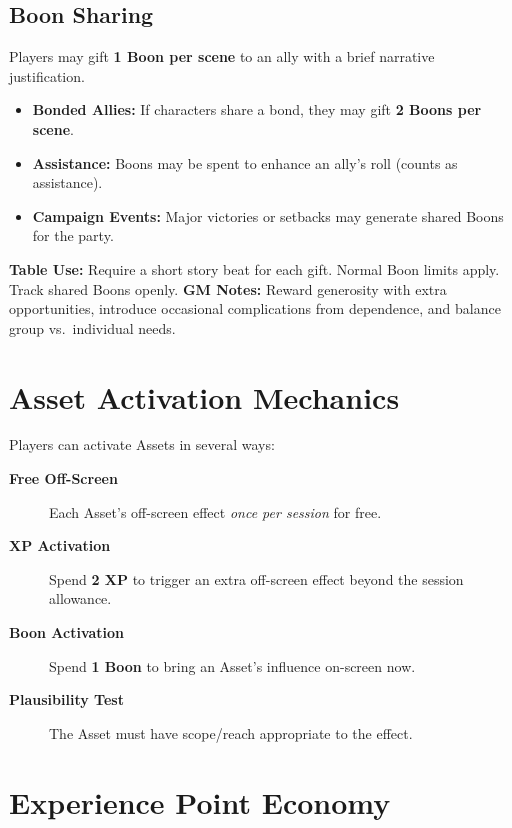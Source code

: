 \subsection{Boon Sharing}

Players may gift \textbf{1 Boon per scene} to an ally with a brief narrative justification.  
\begin{itemize}
  \item \textbf{Bonded Allies:} If characters share a bond, they may gift \textbf{2 Boons per scene}.  
  \item \textbf{Assistance:} Boons may be spent to enhance an ally’s roll (counts as assistance).  
  \item \textbf{Campaign Events:} Major victories or setbacks may generate shared Boons for the party.  
\end{itemize}

\textbf{Table Use:} Require a short story beat for each gift. Normal Boon limits apply. Track shared Boons openly.  
\textbf{GM Notes:} Reward generosity with extra opportunities, introduce occasional complications from dependence, and balance group vs.\ individual needs.

\section{Asset Activation Mechanics}
\label{sec:asset-activations}
Players can activate Assets in several ways:
\begin{description}
\item[\textbf{Free Off-Screen}] Each Asset's off-screen effect \emph{once per session} for free. 
\item[\textbf{XP Activation}] Spend \textbf{2 XP} to trigger an extra off-screen effect beyond the session allowance. 
\item[\textbf{Boon Activation}] Spend \textbf{1 Boon} to bring an Asset's influence on-screen now. 
\item[\textbf{Plausibility Test}] The Asset must have scope/reach appropriate to the effect. 
\end{description}

\section{Experience Point Economy}
\label{sec:xp-economy}


